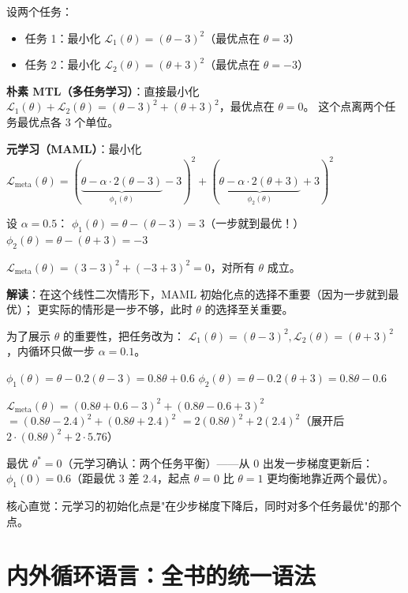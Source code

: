\begin{example}[双层优化的等高线图解]

设两个任务：
\begin{itemize}
  \item 任务 1：最小化 $\mathcal{L}_1(\theta) = (\theta - 3)^2$（最优点在 $\theta = 3$）
  \item 任务 2：最小化 $\mathcal{L}_2(\theta) = (\theta + 3)^2$（最优点在 $\theta = -3$）
\end{itemize}

\textbf{朴素 MTL（多任务学习）}：直接最小化 $\mathcal{L}_1(\theta) + \mathcal{L}_2(\theta) = (\theta-3)^2 + (\theta+3)^2$，最优点在 $\theta = 0$。
这个点离两个任务最优点各 3 个单位。

\textbf{元学习（MAML）}：最小化
$\mathcal{L}_\text{meta}(\theta) = (\underbrace{\theta - \alpha \cdot 2(\theta-3)}_{\phi_1(\theta)} - 3)^2 + (\underbrace{\theta - \alpha \cdot 2(\theta+3)}_{\phi_2(\theta)} + 3)^2$

设 $\alpha = 0.5$：
$\phi_1(\theta) = \theta - (\theta - 3) = 3$（一步就到最优！）
$\phi_2(\theta) = \theta - (\theta + 3) = -3$

$\mathcal{L}_\text{meta}(\theta) = (3 - 3)^2 + (-3 + 3)^2 = 0$，对所有 $\theta$ 成立。

\textbf{解读}：在这个线性二次情形下，MAML 初始化点的选择不重要（因为一步就到最优）；
更实际的情形是一步不够，此时 $\theta$ 的选择至关重要。

为了展示 $\theta$ 的重要性，把任务改为：
$\mathcal{L}_1(\theta) = (\theta - 3)^2, \mathcal{L}_2(\theta) = (\theta + 3)^2$，内循环只做一步 $\alpha = 0.1$。

$\phi_1(\theta) = \theta - 0.2(\theta - 3) = 0.8\theta + 0.6$
$\phi_2(\theta) = \theta - 0.2(\theta + 3) = 0.8\theta - 0.6$

$\mathcal{L}_\text{meta}(\theta) = (0.8\theta + 0.6 - 3)^2 + (0.8\theta - 0.6 + 3)^2$
$= (0.8\theta - 2.4)^2 + (0.8\theta + 2.4)^2$
$= 2(0.8\theta)^2 + 2(2.4)^2$（展开后 $2 \cdot (0.8\theta)^2 + 2 \cdot 5.76$）

最优 $\theta^* = 0$（元学习确认：两个任务平衡）——从 $0$ 出发一步梯度更新后：
$\phi_1(0) = 0.6$（距最优 $3$ 差 $2.4$，起点 $\theta=0$ 比 $\theta=1$ 更均衡地靠近两个最优）。

核心直觉：元学习的初始化点是"在少步梯度下降后，同时对多个任务最优"的那个点。
\end{example}

\section{内外循环语言：全书的统一语法}
\label{sec:inner_outer_language}

